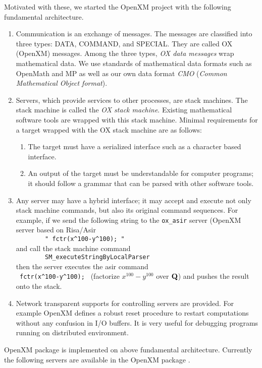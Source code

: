 Motivated with these, we started the OpenXM project with the following
fundamental architecture.
\begin{enumerate}
\item Communication is an exchange of messages. The messages are classified into
three types:
DATA, COMMAND, and SPECIAL.
They are called OX (OpenXM) messages.
Among the three types,
{\it OX data messages} wrap mathematical data.
We use standards of mathematical data formats such as OpenMath and MP
as well as our own data format {\it CMO}
({\it Common Mathematical Object format}).
\item Servers, which provide services to other processes, are stack machines.
The stack machine is called the
{\it OX stack machine}.
Existing mathematical software tools are wrapped with this stack machine.
Minimal requirements for a target wrapped with the OX stack machine
are as follows:
\begin{enumerate}
\item The target must have a serialized interface such as a character based
interface.
\item An output of the target must be understandable for computer programs;
it should follow a grammar that can be parsed with other software tools.
\end{enumerate}
\item Any server may have a hybrid interface;
it may accept and execute not only stack machine commands, 
but also its original command sequences.
For example,
if we send the following string to the {\tt ox\_asir} server 
(OpenXM server based on Risa/Asir \\
\verb+        " fctr(x^100-y^100); "      + \\
and call the stack machine command  \\
\verb+        SM_executeStringByLocalParser    + \\ 
then the server executes the asir command \\
\verb+ fctr(x^100-y^100); + 
(factorize $x^{100}-y^{100}$ over ${\bf Q}$)
and pushes the result onto the stack.
\item Network transparent supports for controlling servers are provided.
For example OpenXM defines a robust reset procedure to restart computations
without any confusion in I/O buffers.
It is very useful for debugging programs running on distributed environment.
\end{enumerate}
OpenXM package  is implemented on above fundamental architecture.
Currently the following servers are available in the OpenXM package
\cite{openxm-web}.

